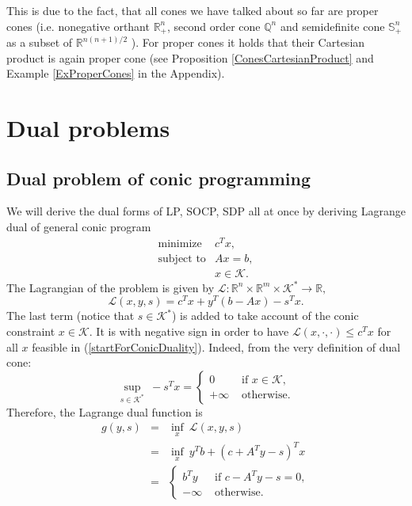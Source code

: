 \documentclass[12pt]{book}
\theoremstyle{definition}
\begin{document}
This is due to the fact, that all cones we have talked about so far are proper cones (i.e. nonegative orthant $\mathbb{R}^n_+$, second order cone $\mathbb{Q}^n$ and semidefinite cone $\mathbb{S}^n_+$ as a subset of $ \mathbb{R}^{n(n+1)/2}$ ). 
For proper cones it holds that their Cartesian product is again proper cone (see Proposition \ref{ConesCartesianProduct} and Example \ref{ExProperCones} in the Appendix).  

\section{Dual problems}


\subsection{Dual problem of conic programming}

We will derive the dual forms of LP, SOCP, SDP all at once by deriving Lagrange dual of general conic program
\begin{equation}
\label{startForConicDuality}
\begin{array}{ll}
\mbox{minimize} & c^Tx,\\
\mbox{subject to}& Ax = b,\\
& x \in \mathcal{K}.
\end{array} 
\end{equation}
The Lagrangian of the problem is given by $\mathcal{L}:\mathbb{R}^n\times\mathbb{R}^m\times\mathcal{K}^*\rightarrow \mathbb{R},$
\begin{equation}
\mathcal{L}(x,y,s) = c^Tx + y^T(b-Ax) - s^Tx. %
\end{equation}
The last term (notice that $s\in\mathcal{K}^*$) is added to take account of the conic constraint $x\in \mathcal{K}$.  
It is with negative sign in order to have $\mathcal{L}(x,\cdot,\cdot)\leq c^Tx$ for all $x$ feasible in (\ref{startForConicDuality}). 
Indeed, from the very definition of dual cone:
\begin{equation}
\sup_{s\in \mathcal{K}^*} \ -s^Tx = 
\left\lbrace \begin{array}{ll} 
0 & \mbox{ if } x\in\mathcal{K},\\ 
+\infty & \mbox{ otherwise.}
\end{array}\right. 
\end{equation}
Therefore, the Lagrange dual function is 
\begin{eqnarray}
g(y,s) &=& \inf_x \ \mathcal{L}(x,y,s) \\
&=& \inf_x \ y^Tb + (c+A^Ty -s)^Tx \\
&=& \left\lbrace \begin{array}{ll} 
b^Ty & \mbox{ if } c-A^Ty - s = 0,\\ 
-\infty & \mbox{ otherwise.}
\end{array}\right. 
\end{eqnarray}
\end{document}
